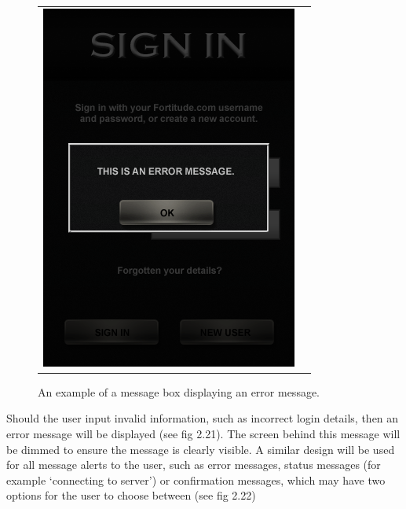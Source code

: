 \begin{figure}[h!]
\begin{tabular}{cc}
\begin{minipage}{0.3\textwidth}
\begin{center}
\begin{minipage}{0.83\textwidth}
		\includegraphics[width=\textwidth]{images/message_box_in_use_mockup}
		\caption{An example of a message box displaying an error message.}
		\label{message_box}
		\end{minipage}
		\end{center}
	\end{minipage}
\end{tabular}
\vspace{-0pt}
\end{figure}

Should the user input invalid information, such as incorrect login details, then an error message will be displayed (see fig 2.21). The screen behind this message will be dimmed to ensure the message is clearly visible. A similar design will be used for all message alerts to the user, such as error messages, status messages (for example ‘connecting to server’) or confirmation messages, which may have two options for the user to choose between (see fig 2.22)

